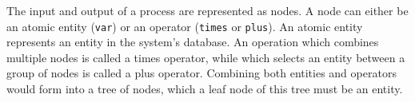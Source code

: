 



The input and output of a process are represented as nodes. A node can either be an atomic entity (\verb!var!) \cite{entity} or an operator (\verb!times! or \verb!plus!).
An atomic entity represents an entity in the system's database.
An operation which combines multiple nodes is called a times operator, while which selects an entity between a group of nodes is called a plus operator.
Combining both entities and operators would form into a tree of nodes, which a leaf node of this tree must be an entity.

